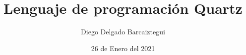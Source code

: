 \documentclass[12pt,a4paper,titlepage,oneside]{book}
\title{Lenguaje de programación Quartz}
\author{Diego Delgado Barcaiztegui}
\date{26 de Enero del 2021}
\begin{document}
\maketitle
\tableofcontents
\justify





\end{document}
